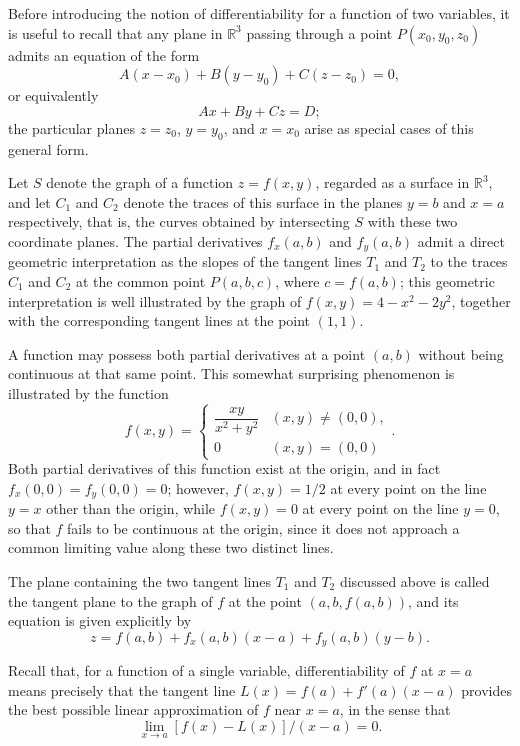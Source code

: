 Before introducing the notion of differentiability for a function of two variables, it is useful to recall that any plane in $\mathbb{R}^3$ passing through a point $P(x_0,y_0,z_0)$ admits an equation of the form
\[
A(x-x_0) + B(y-y_0) + C(z-z_0) = 0,
\] or equivalently
\[
Ax+By+Cz=D;
\] the particular planes $z=z_0$, $y=y_0$, and $x=x_0$ arise as special cases of this general form.

Let $S$ denote the graph of a function $z = f(x,y)$, regarded as a surface in $\mathbb{R}^3$, and let $C_1$ and $C_2$ denote the traces of this surface in the planes $y=b$ and $x=a$ respectively, that is, the curves obtained by intersecting $S$ with these two coordinate planes. The partial derivatives $f_x(a,b)$ and $f_y(a,b)$ admit a direct geometric interpretation as the slopes of the tangent lines $T_1$ and $T_2$ to the traces $C_1$ and $C_2$ at the common point $P(a,b,c)$, where $c = f(a,b)$; this geometric interpretation is well illustrated by the graph of $f(x,y) = 4-x^2-2y^2$, together with the corresponding tangent lines at the point $(1,1)$.

\begin{remark}
A function may possess both partial derivatives at a point $(a,b)$ without being continuous at that same point. This somewhat surprising phenomenon is illustrated by the function
\[
f(x,y) =
\begin{cases}
\dfrac{xy}{x^2+y^2} & (x,y) \neq (0,0), \\[1mm]
0 & (x,y) = (0,0)
\end{cases}.
\]
Both partial derivatives of this function exist at the origin, and in fact $f_x(0,0) = f_y(0,0) = 0$; however, $f(x,y) = 1/2$ at every point on the line $y=x$ other than the origin, while $f(x,y) = 0$ at every point on the line $y=0$, so that $f$ fails to be continuous at the origin, since it does not approach a common limiting value along these two distinct lines.
\end{remark}

The plane containing the two tangent lines $T_1$ and $T_2$ discussed above is called the tangent plane to the graph of $f$ at the point $(a,b,f(a,b))$, and its equation is given explicitly by
\[
z = f(a,b) + f_x(a,b)(x-a) + f_y(a,b)(y-b).
\]

Recall that, for a function of a single variable, differentiability of $f$ at $x=a$ means precisely that the tangent line $L(x) = f(a) + f'(a)(x-a)$ provides the best possible linear approximation of $f$ near $x=a$, in the sense that
\[
\lim_{x \to a} [f(x)-L(x)]/(x-a) = 0.
\]

